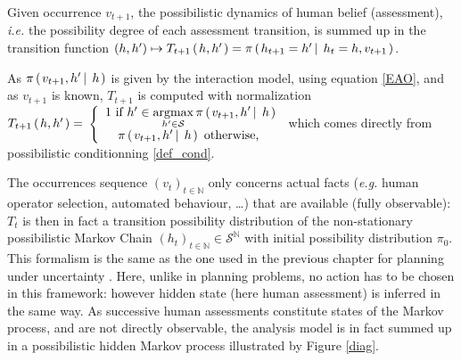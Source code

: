 Given occurrence $v_{t+1}$, the possibilistic dynamics of human belief (assessment), 
\textit{i.e.} the possibility degree of each assessment transition, 
is summed up in the transition function 
$(h,h') \mapsto T_{t+1} \left( \left. h,h' \right. \right) = \pi \left( \left.  h_{t+1} =h' \, \right| \left. \, h_t = h, v_{t+1} \right. \right) $.
\begin{Def}
As $\pi \left( \left.  v_{t+1},h' \, \right| \left. \, h  \right. \right)$ is given by the interaction model,
using equation \ref{EAO}, and as $v_{t+1}$ is known, $T_{t+1}$ is 
computed with normalization \\ $T_{t+1} \left( \left. h, h' \right. \right) =$  
$\left \{ \begin{array}{ccc}
1 \mbox{ if } h' \in \displaystyle \operatorname*{argmax}_{h' \in \mathcal{S}}  \pi \left( \left. v_{t+1},h' \, \right| \left. \, h  \right. \right)  \\
\pi \left( \left. v_{t+1},h' \, \right| \left. \, h  \right. \right) \mbox{ otherwise, }
\end{array} \right .$ 
which comes directly from possibilistic conditionning \ref{def_cond}.
\label{transFunc}
\end{Def}
The occurrences sequence $(v_t)_{t \in \mathbb{N}}$
only concerns actual facts (\textit{e.g.} 
human operator selection, automated behaviour, \ldots) 
that are available (fully observable):
$T_t$ is then in fact a transition possibility distribution 
of the non-stationary possibilistic Markov Chain 
$(h_t)_{t \in \mathbb{N}} \in \mathcal{S}^{\mathbb{N}}$ 
with initial possibility distribution $\pi_0$.
This formalism is the same as the one used in the previous chapter
for planning under uncertainty \cite{Drougard13}. 
Here, unlike in planning problems,
no action has to be chosen
in this framework: 
however hidden state (here human assessment) 
is inferred in the same way.
As successive human assessments constitute states of the Markov process, 
and are not directly observable, 
the analysis model is in fact summed up 
in a possibilistic hidden Markov process 
illustrated by Figure \ref{diag}.

